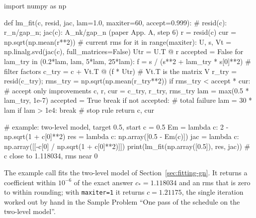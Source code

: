 \begin{pycode}
import numpy as np

def lm_fit(c, resid, jac, lam=1.0, maxiter=60, accept=0.999):
    # resid(c): r_n/gap_n;  jac(c): A_nk/gap_n  (paper App. A, step 6)
    r = resid(c)
    cur = np.sqrt(np.mean(r**2))                 # current rms
    for it in range(maxiter):
        U, s, Vt = np.linalg.svd(jac(c), full_matrices=False)
        Utr = U.T @ r
        accepted = False
        for lam_try in (0.2*lam, lam, 5*lam, 25*lam):
            f = s / (s**2 + lam_try * s[0]**2)    # filter factors
            c_try = c + Vt.T @ (f * Utr)          # Vt.T is the matrix V
            r_try = resid(c_try); rms_try = np.sqrt(np.mean(r_try**2))
            if rms_try < accept * cur:            # accept only improvements
                c, r, cur = c_try, r_try, rms_try
                lam = max(0.5 * lam_try, 1e-7)
                accepted = True
                break
        if not accepted:                           # total failure
            lam = 30 * lam
            if lam > 1e4:
                break                              # stop rule
    return c, cur

# example: two-level model, target 0.5, start c = 0.5
Em = lambda c: 2 - np.sqrt(1 + c[0]**2)
res = lambda c: np.array([0.5 - Em(c)])
jac = lambda c: np.array([[-c[0] / np.sqrt(1 + c[0]**2)]])
print(lm_fit(np.array([0.5]), res, jac))  # c close to 1.118034, rms near 0
\end{pycode}

The example call fits the two-level model of Section~\ref{sec:fitting-gn}. It returns a coefficient within $10^{-6}$ of the exact answer $c_*=1.118034$ and an rms that is zero to within rounding; with \texttt{maxiter=1} it returns $c=1.21175$, the single iteration worked out by hand in the Sample Problem ``One pass of the schedule on the two-level model''.

